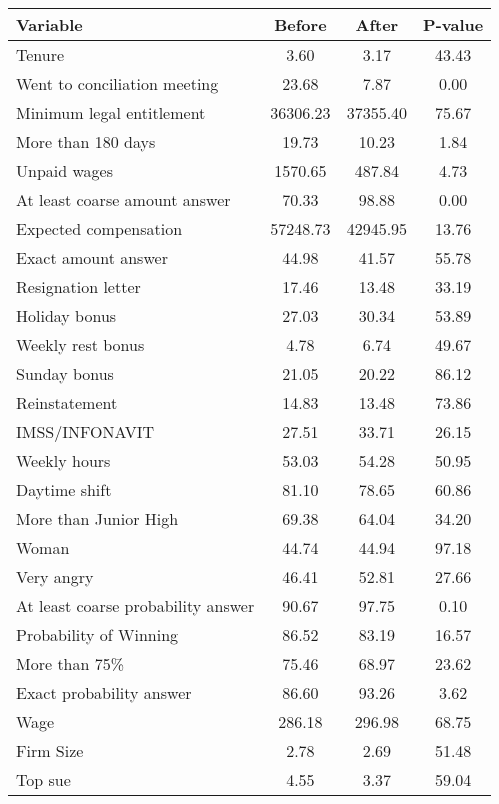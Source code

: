 \begin{tabular}{@{\extracolsep{5pt}} lccc} 
\toprule 
Variable & Before & After & P-value \\ 
\midrule
\midrule
Tenure &     3.60 &     3.17 & 43.43 \\ 
Went to conciliation meeting &    23.68 &     7.87 &  0.00 \\ 
Minimum legal entitlement & 36306.23 & 37355.40 & 75.67 \\ 
More than 180 days &    19.73 &    10.23 &  1.84 \\ 
Unpaid wages &  1570.65 &   487.84 &  4.73 \\ 
At least coarse amount answer &    70.33 &    98.88 &  0.00 \\ 
Expected compensation & 57248.73 & 42945.95 & 13.76 \\ 
Exact amount answer &    44.98 &    41.57 & 55.78 \\ 
Resignation letter &    17.46 &    13.48 & 33.19 \\ 
Holiday bonus &    27.03 &    30.34 & 53.89 \\ 
Weekly rest bonus &     4.78 &     6.74 & 49.67 \\ 
Sunday bonus &    21.05 &    20.22 & 86.12 \\ 
Reinstatement &    14.83 &    13.48 & 73.86 \\ 
IMSS/INFONAVIT &    27.51 &    33.71 & 26.15 \\ 
Weekly hours &    53.03 &    54.28 & 50.95 \\ 
Daytime shift &    81.10 &    78.65 & 60.86 \\ 
More than Junior High &    69.38 &    64.04 & 34.20 \\ 
Woman &    44.74 &    44.94 & 97.18 \\ 
Very angry &    46.41 &    52.81 & 27.66 \\ 
At least coarse probability answer &    90.67 &    97.75 &  0.10 \\ 
Probability of Winning &    86.52 &    83.19 & 16.57 \\ 
More than 75\% &    75.46 &    68.97 & 23.62 \\ 
Exact probability answer &    86.60 &    93.26 &  3.62 \\ 
Wage &   286.18 &   296.98 & 68.75 \\ 
Firm Size &     2.78 &     2.69 & 51.48 \\ 
Top sue &     4.55 &     3.37 & 59.04 \\ 
\bottomrule
\end{tabular}

